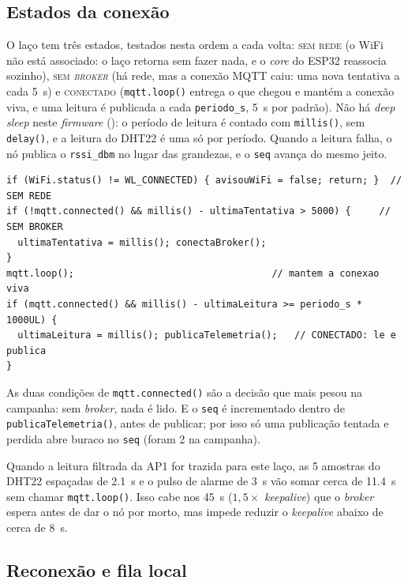 \subsection{Estados da conexão}

O laço tem três estados, testados nesta ordem a cada volta:
\textsc{sem rede} (o WiFi não está associado: o laço retorna sem fazer
nada, e o \emph{core} do ESP32 reassocia sozinho), \textsc{sem
\emph{broker}} (há rede, mas a conexão MQTT caiu: uma nova tentativa a
cada \SI{5}{\second}) e \textsc{conectado} (\texttt{mqtt.loop()} entrega o
que chegou e mantém a conexão viva, e uma leitura é publicada a cada
\texttt{periodo\_s}, \SI{5}{\second} por padrão). Não há \emph{deep
sleep} neste \emph{firmware} (): o período de leitura é contado com
\texttt{millis()}, sem \texttt{delay()}, e a leitura do DHT22 é uma só
por período. Quando a leitura falha, o nó publica o \texttt{rssi\_dbm}
no lugar das grandezas, e o \texttt{seq} avança do mesmo jeito.

\begin{lstlisting}[style=terminal,
  caption={O laço do \emph{firmware} da campanha (\texttt{sketch.ino}, \emph{commit} \texttt{7b4482e})},
  label={lst:laco-com}]
if (WiFi.status() != WL_CONNECTED) { avisouWiFi = false; return; }  // SEM REDE
if (!mqtt.connected() && millis() - ultimaTentativa > 5000) {     // SEM BROKER
  ultimaTentativa = millis(); conectaBroker();
}
mqtt.loop();                                   // mantem a conexao viva
if (mqtt.connected() && millis() - ultimaLeitura >= periodo_s * 1000UL) {
  ultimaLeitura = millis(); publicaTelemetria();   // CONECTADO: le e publica
}
\end{lstlisting}

As duas condições de \texttt{mqtt.connected()} são a decisão que mais
pesou na campanha: sem \emph{broker}, nada é lido. E o \texttt{seq} é
incrementado dentro de \texttt{publicaTelemetria()}, antes de publicar;
por isso só uma publicação tentada e perdida abre buraco no \texttt{seq}
(foram 2 na campanha).

Quando a leitura filtrada da AP1 for trazida para este laço, as 5
amostras do DHT22 espaçadas de \SI{2,1}{\second} e o pulso de alarme de
\SI{3}{\second} vão somar cerca de \SI{11,4}{\second} sem chamar
\texttt{mqtt.loop()}. Isso cabe nos \SI{45}{\second} ($1{,}5 \times$
\emph{keepalive}) que o \emph{broker} espera antes de dar o nó por morto,
mas impede reduzir o \emph{keepalive} abaixo de cerca de
\SI{8}{\second}.

\subsection{Reconexão e fila local}

